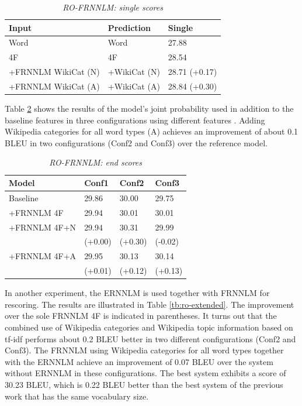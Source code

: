 \documentclass[a4paper]{article}
\begin{document}
\begin{table}
\caption{\it RO-FRNNLM: single scores}
\vspace{2mm}
\centering
  \begin{tabular}{lll}
  	\hline
  	Input               & Prediction   & Single        \\ \hline\hline
  	Word                & Word         & 27.88         \\
  	4F                  & 4F           & 28.54         \\ \hline
  	+FRNNLM WikiCat (N) & +WikiCat (N) & 28.71 (+0.17) \\
  	+FRNNLM WikiCat (A) & +WikiCat (A) & 28.84 (+0.30)
  \end{tabular}
  \label{tb:ro-factored-single}
\end{table}

Table \ref{tb:ro-factored-combi} shows the results of the model's joint probability used in addition to the baseline features in three configurations using different features \cite{niehuesusing}. 
Adding Wikipedia categories for all word types (A) achieves an improvement of about 0.1 BLEU in two configurations (Conf2 and Conf3) over the reference model.


\begin{table}
\caption{\it RO-FRNNLM: end scores}
\vspace{2mm}
\centering
  \begin{tabular}{llll}
  	\hline
  	Model        & Conf1   & Conf2   & Conf3   \\ \hline\hline
  	Baseline     & 29.86   & 30.00   & 29.75   \\
  	+FRNNLM 4F   & 29.94   & 30.01   & 30.01   \\ \hline
  	+FRNNLM 4F+N & 29.94   & 30.31   & 29.99   \\
  	             & (+0.00) & (+0.30) & (-0.02) \\
  	+FRNNLM 4F+A & 29.95   & 30.13   & 30.14   \\
  	             & (+0.01) & (+0.12) & (+0.13)
  \end{tabular}
  \label{tb:ro-factored-combi}
\end{table}

In another experiment, the ERNNLM is used together with FRNNLM for rescoring. The results are illustrated in Table \ref{tb:ro-extended}. The improvement over the sole FRNNLM 4F is indicated in parentheses. It turns out that the combined use of Wikipedia categories and Wikipedia topic information based on tf-idf performs about 0.2 BLEU better in two different configurations (Conf2 and Conf3). The FRNNLM using Wikipedia categories for all word types together with the ERNNLM achieve an improvement of 0.07 BLEU over the system without ERNNLM in these configurations.
The best system exhibits a score of 30.23 BLEU, which is 0.22 BLEU better than the best system of the previous work \cite{niehuesusing} that has the same vocabulary size.
\end{document}
